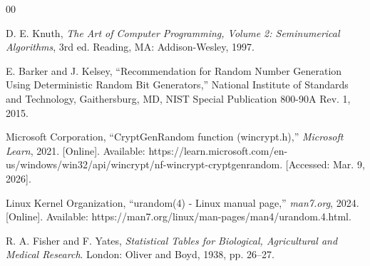 \documentclass[conference]{IEEEtran}
\begin{document}
\begin{thebibliography}{00}

D. E. Knuth, \emph{The Art of Computer Programming, Volume 2: Seminumerical Algorithms}, 3rd ed. Reading, MA: Addison-Wesley, 1997.

E. Barker and J. Kelsey, ``Recommendation for Random Number Generation Using Deterministic Random Bit Generators,'' National Institute of Standards and Technology, Gaithersburg, MD, NIST Special Publication 800-90A Rev. 1, 2015.

Microsoft Corporation, ``CryptGenRandom function (wincrypt.h),'' \emph{Microsoft Learn}, 2021. [Online]. Available: https://learn.microsoft.com/en-us/windows/win32/api/wincrypt/nf-wincrypt-cryptgenrandom. [Accessed: Mar. 9, 2026].

Linux Kernel Organization, ``urandom(4) - Linux manual page,'' \emph{man7.org}, 2024. [Online]. Available: https://man7.org/linux/man-pages/man4/urandom.4.html.

R. A. Fisher and F. Yates, \emph{Statistical Tables for Biological, Agricultural and Medical Research}. London: Oliver and Boyd, 1938, pp. 26--27.

\end{thebibliography}
\end{document}
